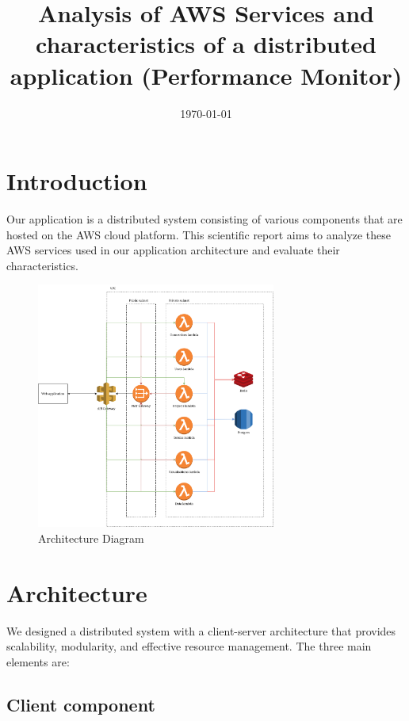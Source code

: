 \documentclass{article}
\title{Analysis of AWS Services and characteristics of a distributed application (Performance Monitor)}
\author{}
\date{\today}
\begin{document}
\maketitle

\section{Introduction}

\hspace{1cm} Our application is a distributed system consisting of various components that are hosted on the AWS cloud platform. This scientific report aims to analyze these AWS services used in our application architecture and evaluate their characteristics. 

\begin{figure}[htbp]
    \centering
    \includegraphics[width=0.7\textwidth]{pcd2.drawio.png}
    \caption{Architecture Diagram}
    \label{fig:diagrama}
\end{figure}

\section{Architecture}

\hspace{1cm} We designed a distributed system with a client-server architecture that provides scalability, modularity,
and effective resource management. The three main elements are:

\subsection{Client component}
\end{document}
